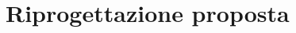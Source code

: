 \documentclass[../../main.tex]{subfiles}
\begin{document}
\section{Riprogettazione proposta}
\end{document}
